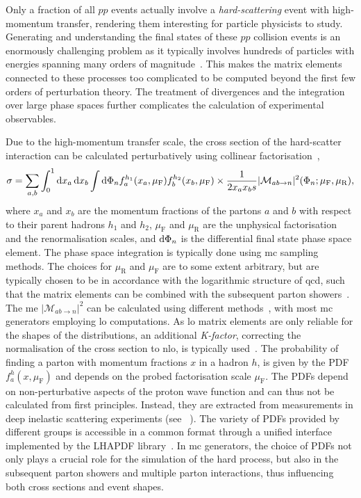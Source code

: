 Only a fraction of all $pp$ events actually involve a \textit{hard-scattering} event with high-momentum transfer, rendering them interesting for particle physicists to study. Generating and understanding the final states of these $pp$ collision events is an enormously challenging problem as it typically involves hundreds of particles with energies spanning many orders of magnitude~\cite{Buckley:2011ms}. This makes the matrix elements connected to these processes too complicated to be computed beyond the first few orders of perturbation theory. The treatment of divergences and the integration over large phase spaces further complicates the calculation of experimental observables.

Due to the high-momentum transfer scale, the cross section of the hard-scatter interaction can be calculated perturbatively using collinear factorisation~\cite{Buckley:2011ms},
\begin{equation}
	\sigma = \sum_{a,b}{\int_0^1{\mathop{}\!\mathrm{d} x_a \mathop{}\!\mathrm{d} x_b\int{\mathop{}\!\mathrm{d}\Phi_n f_a^{h_1}(x_a,\mu_\mathrm{F}) f_b^{h_2}(x_b,\mu_\mathrm{F})} \times \frac{1}{2 x_a x_b s}\vert \mathcal{M}_{ab\rightarrow n} \vert^2 (\Phi_n; \mu_\mathrm{F},\mu_\mathrm{R})}},
\end{equation}
where $x_a$ and $x_b$ are the momentum fractions of the partons $a$ and $b$ with respect to their parent hadrons $h_1$ and $h_2$, $\mu_\mathrm{F}$ and $\mu_\mathrm{R}$ are the unphysical factorisation and the renormalisation scales, and $\mathop{}\!\mathrm{d}\Phi_n$ is the differential final state phase space element.
The phase space integration is typically done using \gls{mc} sampling methods.
The choices for $\mu_\mathrm{R}$ and $\mu_\mathrm{F}$ are to some extent arbitrary, but are typically chosen to be in accordance with the logarithmic structure of \gls{qcd}, such that the matrix elements can be combined with the subsequent parton showers~\cite{Buckley:2011ms}.
The \gls{me} $\vert\mathcal{M}_{ab\rightarrow n}\vert^2$ can be calculated using different methods~\cite{Buckley:2011ms}, with most \gls{mc} generators employing \gls{lo} computations.
As \gls{lo} matrix elements are only reliable for the shapes of the distributions, an additional \textit{K-factor}, correcting the normalisation of the cross section to \gls{nlo}, is typically used~\cite{Buckley:2011ms}.
The probability of finding a parton with momentum fractions $x$ in a hadron $h$, is given by the \gls{PDF} $f_a^{h}(x,\mu_\mathrm{F})$ and depends on the probed factorisation scale $\mu_\mathrm{F}$.
The \glspl{PDF} depend on non-perturbative aspects of the proton wave function and can thus not be calculated from first principles. Instead, they are extracted from measurements in deep inelastic scattering experiments (see \eg~\cite{Gribov:1972ri, Blumlein:1996wj}). The variety of \glspl{PDF} provided by different groups is accessible in a common format through a unified interface implemented by the \textsc{LHAPDF} library~\cite{Buckley:2014ana}. In \gls{mc} generators, the choice of \glspl{PDF} not only plays a crucial role for the simulation of the hard process, but also in the subsequent parton showers and multiple parton interactions, thus influencing both cross sections and event shapes.

